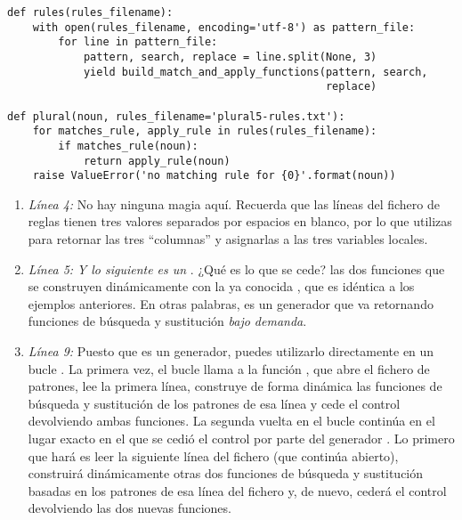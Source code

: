 \noindent\begin{minipage}{\textwidth}
\begin{lstlisting}[mathescape=True]
def rules(rules_filename):
    with open(rules_filename, encoding='utf-8') as pattern_file:
        for line in pattern_file:
            pattern, search, replace = line.split(None, 3)
            yield build_match_and_apply_functions(pattern, search,
                                                  replace)

def plural(noun, rules_filename='plural5-rules.txt'):
    for matches_rule, apply_rule in rules(rules_filename):
        if matches_rule(noun):
            return apply_rule(noun)
    raise ValueError('no matching rule for {0}'.format(noun))
\end{lstlisting}
\end{minipage}

\begin{enumerate}

\item \emph{Línea 4:} No hay ninguna magia aquí. Recuerda que las líneas del fichero de reglas tienen tres valores separados por espacios en blanco, por lo que utilizas  para retornar las tres ``columnas'' y asignarlas a las tres variables locales.

\item \emph{Línea 5:} \emph{Y lo siguiente es un }. ¿Qué es lo que se cede? las dos funciones que se construyen dinámicamente con la ya conocida , que es idéntica a los ejemplos anteriores. En otras palabras,  es un generador que va retornando funciones de búsqueda y sustitución \emph{bajo demanda}.

\item \emph{Línea 9:} Puesto que  es un generador, puedes utilizarlo directamente en un bucle . La primera vez, el bucle  llama a la función , que abre el fichero de patrones, lee la primera línea, construye de forma dinámica las funciones de búsqueda y sustitución de los patrones de esa línea y cede el control devolviendo ambas funciones. La segunda vuelta en el bucle  continúa en el lugar exacto en el que se cedió el control por parte del generador . Lo primero que hará es leer la siguiente línea del fichero (que continúa abierto), construirá dinámicamente otras dos funciones de búsqueda y sustitución basadas en los patrones de esa línea del fichero y, de nuevo, cederá el control devolviendo las dos nuevas funciones.

\end{enumerate}


